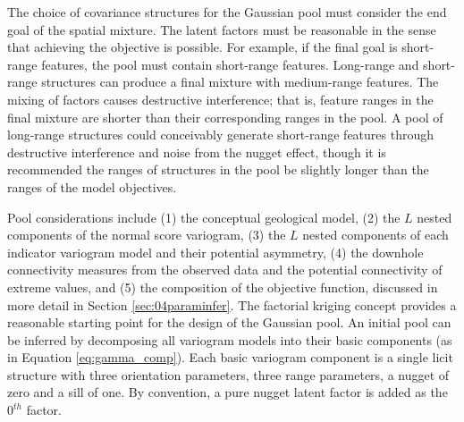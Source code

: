 The choice of covariance structures for the Gaussian pool must consider the end goal of the spatial mixture. The latent factors must be reasonable in the sense that achieving the objective is possible. For example, if the final goal is short-range features, the pool must contain short-range features. Long-range and short-range structures can produce a final mixture with medium-range features. The mixing of factors causes destructive interference; that is, feature ranges in the final mixture are shorter than their corresponding ranges in the pool. A pool of long-range structures could conceivably generate short-range features through destructive interference and noise from the nugget effect, though it is recommended the ranges of structures in the pool be slightly longer than the ranges of the model objectives.

Pool considerations include (1) the conceptual geological model, (2) the $L$ nested components of the normal score variogram, (3) the $L$ nested components of each indicator variogram model and their potential asymmetry, (4) the downhole connectivity measures from the observed data and the potential connectivity of extreme values, and (5) the composition of the objective function, discussed in more detail in Section \ref{sec:04paraminfer}. The factorial kriging concept provides a reasonable starting point for the design of the Gaussian pool. An initial pool can be inferred by decomposing all variogram models into their basic components (as in Equation \ref{eq:gamma_comp}). Each basic variogram component is a single licit structure with three orientation parameters, three range parameters, a nugget of zero and a sill of one. By convention, a pure nugget latent factor is added as the $0^{th}$ factor.

